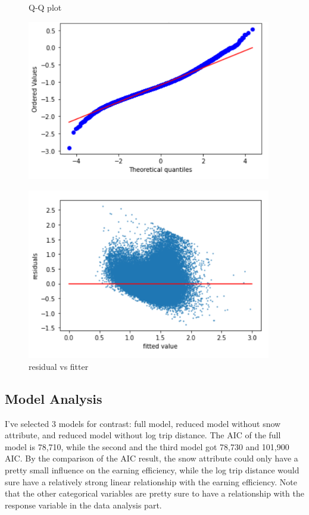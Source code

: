 \documentclass[11pt]{article}
\begin{document}
\begin{figure}[h]
\begin{minipage}{.5\textwidth}
    \centering
    \caption{Q-Q plot}\label{f10}
    \includegraphics[width=0.95\textwidth]{qq.jpg}
\end{minipage}
\begin{minipage}{.5\textwidth}
    \centering
    \caption{residual vs fitter} \label{f11}
    \includegraphics[width=0.95\textwidth]{resfit.jpg}
\end{minipage}
\end{figure}

\subsection{Model Analysis}
I've selected 3 models for contrast: full model, reduced model without snow attribute, and reduced model without log trip distance. The AIC of the full model is 78,710, while the second and the third model got 78,730 and 101,900 AIC. By the comparison of the AIC result, the snow attribute could only have a pretty small influence on the earning efficiency, while the log trip distance would sure have a relatively strong linear relationship with the earning efficiency. Note that the other categorical variables are pretty sure to have a relationship with the response variable in the data analysis part.
\end{document}
